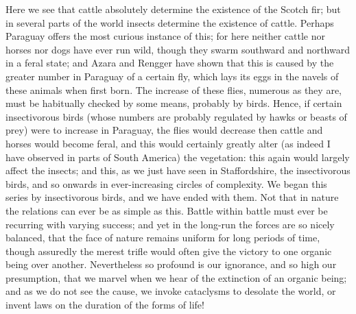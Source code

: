 \indent Here we see that cattle absolutely determine the existence of the Scotch fir; but in several parts of the world insects determine the existence of cattle. Perhaps Paraguay offers the most curious instance of this; for here neither cattle nor horses nor dogs have ever run wild, though they swarm southward and northward in a feral state; and Azara and Rengger have shown that this is caused by the greater number in Paraguay of a certain fly, which lays its eggs in the navels of these animals when first born. The increase of these flies, numerous as they are, must be habitually checked by some means, probably by birds. Hence, if certain insectivorous birds (whose numbers are probably regulated by hawks or beasts of prey) were to increase in Paraguay, the flies would decrease then cattle and horses would become feral, and this would certainly greatly alter (as indeed I have observed in parts of South America) the vegetation: this again would largely affect the insects; and this, as we just have seen in Staffordshire, the insectivorous birds, and so onwards in ever-increasing circles of complexity. We began this series by insectivorous birds, and we have ended with them. Not that in nature the relations can ever be as simple as this. Battle within battle must ever be recurring with varying success; and yet in the long-run the forces are so nicely balanced, that the face of nature remains uniform for long periods of time, though assuredly the merest trifle would often give the victory to one organic being over another. Nevertheless so profound is our ignorance, and so high our presumption, that we marvel when we hear of the extinction of an organic being; and as we do not see the cause, we invoke cataclysms to desolate the world, or invent laws on the duration of the forms of life!\\
